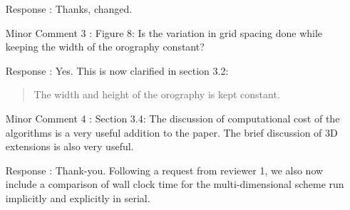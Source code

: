\documentclass[12pt]{article}
\begin{document}
\begin{enumerate}
\item [Response]: Thanks, changed.

\item [Minor Comment 3]: Figure 8: Is the variation in grid spacing done while keeping the width of the orography constant? 

\item [Response]: Yes. This is now clarified in section 3.2:
\begin{quote}
The width and height of the orography is kept constant.
\end{quote}

\item [Minor Comment 4]: Section 3.4: The discussion of computational cost of the algorithms is a very useful addition to the paper. The brief discussion of 3D extensions is also very useful.

\item [Response]: Thank-you. Following a request from reviewer 1, we also now include a comparison of wall clock time for the multi-dimensional scheme run implicitly and explicitly in serial. 
\end{enumerate}




\end{document}

